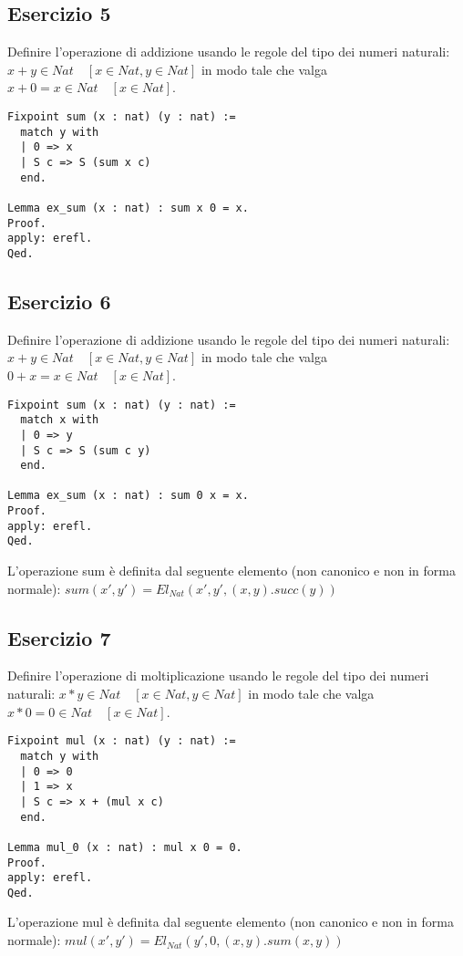 \subsection{Esercizio 5}

Definire l'operazione di addizione usando le regole del tipo dei numeri naturali:
$x + y \in Nat \quad [x \in Nat, y \in Nat]$
in modo tale che valga $x + 0 = x \in Nat \quad [x \in Nat]$.

\begin{lstlisting}[language=Coq]
Fixpoint sum (x : nat) (y : nat) :=
  match y with
  | 0 => x
  | S c => S (sum x c)
  end.

Lemma ex_sum (x : nat) : sum x 0 = x.
Proof.
apply: erefl.
Qed.
\end{lstlisting}

\subsection{Esercizio 6}

Definire l'operazione di addizione usando le regole del tipo dei numeri naturali:
$x + y \in Nat \quad [x \in Nat, y \in Nat]$
in modo tale che valga $0 + x = x \in Nat \quad [x \in Nat]$.

\begin{lstlisting}[language=Coq]
Fixpoint sum (x : nat) (y : nat) :=
  match x with
  | 0 => y
  | S c => S (sum c y)
  end.

Lemma ex_sum (x : nat) : sum 0 x = x.
Proof.
apply: erefl.
Qed.
\end{lstlisting}

L'operazione sum è definita dal seguente elemento (non canonico e non in
forma normale): $sum(x',y') = El_{Nat}(x',y',(x,y).succ(y))$

\subsection{Esercizio 7}

Definire l'operazione di moltiplicazione usando le regole del tipo dei numeri 
naturali: $x*y \in Nat \quad [x \in Nat, y \in Nat]$
in modo tale che valga $x*0 = 0 \in Nat \quad [x \in Nat]$.

\begin{lstlisting}[language=Coq]
Fixpoint mul (x : nat) (y : nat) :=
  match y with
  | 0 => 0
  | 1 => x
  | S c => x + (mul x c)
  end.

Lemma mul_0 (x : nat) : mul x 0 = 0.
Proof.
apply: erefl.
Qed.
\end{lstlisting}

L'operazione mul è definita dal seguente elemento (non canonico e non in
forma normale): $mul(x',y') = El_{Nat}(y',0,(x,y).sum(x,y))$
